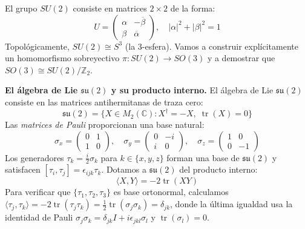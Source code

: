 \begin{example}\label{ex:su2_so3}
El grupo $SU(2)$ consiste en matrices $2 \times 2$ de la forma:
\begin{equation}
U = \begin{pmatrix}
\alpha & -\overline{\beta} \\
\beta & \overline{\alpha}
\end{pmatrix}, \quad |\alpha|^2 + |\beta|^2 = 1
\end{equation}
Topológicamente, $SU(2) \cong S^3$ (la 3-esfera). Vamos a construir explícitamente un homomorfismo sobreyectivo $\pi: SU(2) \to SO(3)$ y a demostrar que $SO(3) \cong SU(2)/\mathbb{Z}_2$.

\textbf{El álgebra de Lie $\mathfrak{su}(2)$ y su producto interno.}
El álgebra de Lie $\mathfrak{su}(2)$ consiste en las matrices antihermitanas de traza cero:
\[
	\mathfrak{su}(2) = \{X \in M_2(\mathbb{C}) : X^\dagger = -X, \; \operatorname{tr}(X) = 0\}
\]
Las \textit{matrices de Pauli} proporcionan una base natural:
\begin{equation}
\sigma_x = \begin{pmatrix}
0 & 1 \\
1 & 0
\end{pmatrix}, \quad
\sigma_y = \begin{pmatrix}
0 & -i \\
i & 0
\end{pmatrix}, \quad
\sigma_z = \begin{pmatrix}
1 & 0 \\
0 & -1
\end{pmatrix}
\end{equation}
Los generadores $\tau_k = \frac{i}{2}\sigma_k$ para $k \in \{x, y, z\}$ forman una base de $\mathfrak{su}(2)$ y satisfacen $[\tau_i, \tau_j] = \epsilon_{ijk}\tau_k$. Dotamos a $\mathfrak{su}(2)$ del producto interno:
\begin{equation}\label{eq:inner_product_su2}
	\langle X, Y \rangle = -2\operatorname{tr}(XY)
\end{equation}
Para verificar que $\{\tau_1, \tau_2, \tau_3\}$ es base ortonormal, calculamos $\langle \tau_j, \tau_k \rangle = -2\operatorname{tr}(\tau_j \tau_k) = \frac{1}{2}\operatorname{tr}(\sigma_j \sigma_k) = \delta_{jk}$, donde la última igualdad usa la identidad de Pauli $\sigma_j \sigma_k = \delta_{jk} I + i\epsilon_{jkl}\sigma_l$ y $\operatorname{tr}(\sigma_l) = 0$.


\end{example}

